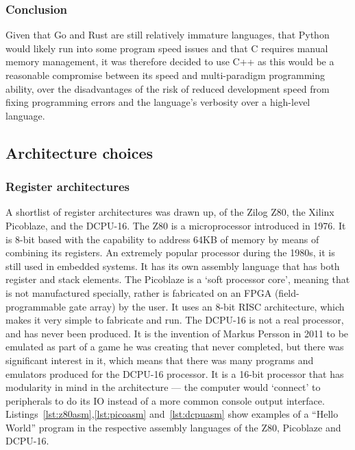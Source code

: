 \subsubsection{Conclusion}
Given that Go and Rust are still relatively immature languages, that Python
would likely run into some program speed issues and that C requires manual
memory management, it was therefore decided to use C++ as this would be a
reasonable compromise between its speed and multi-paradigm programming ability,
over the disadvantages of the risk of reduced development speed from fixing
programming errors and the language's verbosity over a high-level language.

\subsection{Architecture choices}

\subsubsection{Register architectures}
A shortlist of register architectures was drawn up, of the Zilog Z80, the Xilinx
Picoblaze, and the DCPU-16. The Z80 is a microprocessor introduced in 1976. It
is 8-bit based with the capability to address 64KB of memory by means of
combining its registers. An extremely popular processor during the 1980s, it is
still used in embedded systems. It has its own assembly language that has both
register and stack elements. The Picoblaze is a `soft processor core', meaning
that is not manufactured specially, rather is fabricated on an FPGA
(field-programmable gate array) by the user. It uses an 8-bit RISC architecture,
which makes it very simple to fabricate and run. The DCPU-16 is not a real
processor, and has never been produced. It is the invention of Markus Persson in
2011 to be emulated as part of a game he was creating that never completed, but
there was significant interest in it, which means that there was many programs
and emulators produced for the DCPU-16 processor. It is a 16-bit processor that
has modularity in mind in the architecture --- the computer would `connect' to
peripherals to do its IO instead of a more common console output interface.
Listings~\ref{lst:z80asm},\ref{lst:picoasm} and~\ref{lst:dcpuasm} show examples
of a ``Hello World'' program in the respective assembly languages of the Z80,
Picoblaze and DCPU-16.

